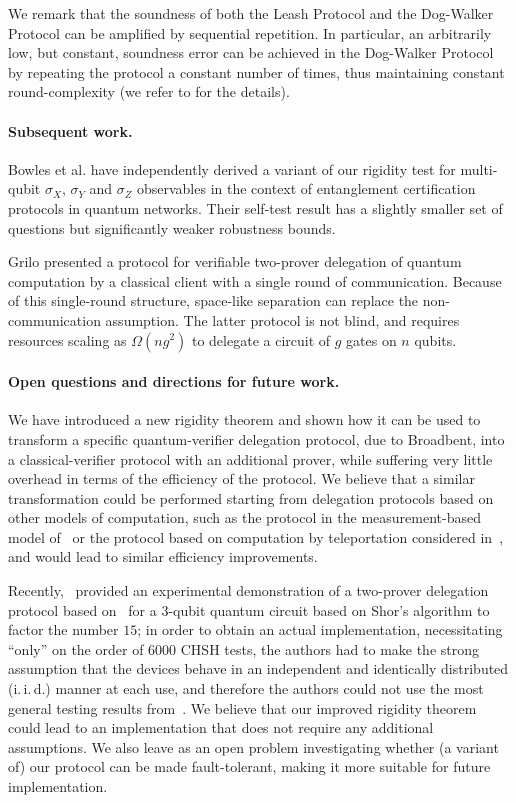 \documentclass{toc}
\begin{document}
We remark that the soundness of both the Leash Protocol and the Dog-Walker Protocol can be amplified by sequential repetition. In particular, an arbitrarily low, but constant, soundness error can be achieved in the Dog-Walker Protocol by repeating the protocol a constant number of times, thus maintaining constant round-complexity (we refer to  for the details).

\paragraph{Subsequent work.}
Bowles et al. \cite{BowlesSCA18}  have independently derived a
variant of our rigidity test for multi-qubit $\sigma_X$, $\sigma_Y$ and $\sigma_Z$ observables
in the context of entanglement certification protocols in
quantum networks.
Their self-test result has a slightly smaller set of questions but  significantly weaker robustness
bounds.

Grilo \cite{Grilo17} presented a protocol for verifiable
two-prover delegation of quantum computation by a classical client with a single round of communication. Because of this single-round structure, space-like separation can replace the non-communication assumption. The latter protocol is not blind, and requires resources scaling as $\Omega(ng^2)$ to delegate a circuit of $g$ gates on $n$ qubits.

\paragraph{Open questions and directions for future work.}
We have introduced a new rigidity theorem and shown how it can be used to transform a specific quantum-verifier delegation protocol, due to Broadbent, into a classical-verifier protocol with an additional prover, while suffering very little overhead in terms of the efficiency of the protocol. We believe that a similar transformation could be performed starting from delegation protocols based on other models of computation, such as the protocol in the measurement-based model of~\cite{fitzsimons12vubqc} or the protocol based on computation by teleportation considered in~\cite{reichardt2012classical}, and would lead to similar efficiency improvements. 

Recently,~\cite{experiment_ruv} provided an experimental demonstration of a
two-prover delegation protocol based on~\cite{reichardt2012classical} for a
$3$-qubit quantum circuit based on Shor's algorithm to factor the number $15$;
in order to obtain an actual implementation, necessitating ``only'' on the order
of $6000$ CHSH tests, the authors had to make the strong assumption that the
devices behave in an independent and identically distributed (i.\,i.\,d.)
manner at each use, and therefore the authors could not use the most
general testing results from~\cite{reichardt2012classical}. We believe that our
improved rigidity theorem could lead to an implementation that does not require
any additional assumptions. We also leave as an open problem investigating whether (a
variant of) our protocol can be made fault-tolerant, making it more suitable for
future implementation.
\end{document}
